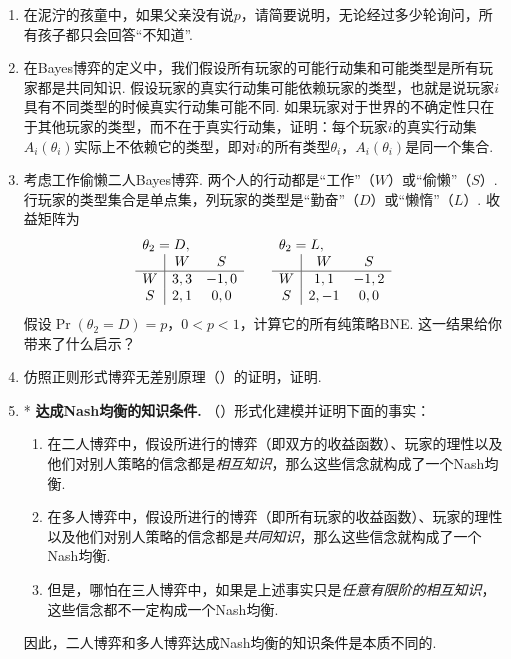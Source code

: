\begin{enumerate}[wide, labelindent=0pt]
    \item \label{exercise:muddy-children-no-p} 在泥泞的孩童中，如果父亲没有说$p$，请简要说明，无论经过多少轮询问，所有孩子都只会回答“不知道”.
    
    \item 在Bayes博弈的定义中，我们假设所有玩家的可能行动集和可能类型是所有玩家都是共同知识. 假设玩家的真实行动集可能依赖玩家的类型，也就是说玩家$i$具有不同类型的时候真实行动集可能不同. 如果玩家对于世界的不确定性只在于其他玩家的类型，而不在于真实行动集，证明：每个玩家$i$的真实行动集$A_i(\theta_i)$实际上不依赖它的类型，即对$i$的所有类型$\theta_i$，$A_i(\theta_i)$是同一个集合.

    \item 考虑工作偷懒二人Bayes博弈. 两个人的行动都是“工作”（$W$）或“偷懒”（$S$）. 行玩家的类型集合是单点集，列玩家的类型是“勤奋”（$D$）或“懒惰”（$L$）. 收益矩阵为
    \[\begin{array}{c|cc}
        \multicolumn{3}{l}{\theta_2=D,}\\
         &W&S  \\\hline
         W&3,3&-1,0\\
         S&2,1&0,0\\
    \end{array}\qquad \begin{array}{c|cc}
        \multicolumn{3}{l}{\theta_2=L,}\\
         &W&S  \\\hline
         W&1,1&-1,2\\
         S&2,-1&0,0\\
    \end{array}\]
    假设$\Pr(\theta_2=D)=p$，$0<p<1$，计算它的所有纯策略BNE. 这一结果给你带来了什么启示？

    \item \label{exercise:exante-expost-equivalence} 仿照正则形式博弈无差别原理（）的证明，证明.

    \item *\label{exercise:Aumann-NE-common-knowledge} \textbf{达成Nash均衡的知识条件. }（\cite{aumannEpistemicConditionsNash1995}）形式化建模并证明下面的事实：
    \begin{enumerate}
        \item 在二人博弈中，假设所进行的博弈（即双方的收益函数）、玩家的理性以及他们对别人策略的信念都是\textit{相互知识}，那么这些信念就构成了一个Nash均衡. 
        \item 在多人博弈中，假设所进行的博弈（即所有玩家的收益函数）、玩家的理性以及他们对别人策略的信念都是\textit{共同知识}，那么这些信念就构成了一个Nash均衡. 
        \item 但是，哪怕在三人博弈中，如果是上述事实只是\textit{任意有限阶的相互知识}，这些信念都不一定构成一个Nash均衡.
    \end{enumerate}
    因此，二人博弈和多人博弈达成Nash均衡的知识条件是本质不同的.


\end{enumerate}
